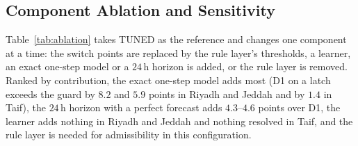 \documentclass[3p,twocolumn,number]{elsarticle}
\begin{document}
\subsection{Component Ablation and Sensitivity}
\label{subsec:abl_component}

Table~\ref{tab:ablation} takes TUNED as the reference and changes one component at a time: the switch points are replaced by the rule layer's thresholds, a learner, an exact one-step model or a $24\,$h horizon is added, or the rule layer is removed. Ranked by contribution, the exact one-step model adds most (D1 on a latch exceeds the guard by $8.2$ and $5.9$ points in Riyadh and Jeddah and by $1.4$ in Taif), the $24\,$h horizon with a perfect forecast adds $4.3$--$4.6$ points over D1, the learner adds nothing in Riyadh and Jeddah and nothing resolved in Taif, and the rule layer is needed for admissibility in this configuration.
\end{document}

